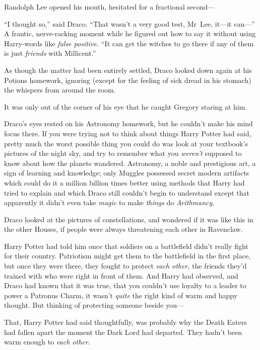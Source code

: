 Randolph Lee opened his mouth, hesitated for a fractional second—

“I thought so,” said Draco. “That wasn’t a very good test, Mr~Lee, it—it can—” A frantic, nerve-racking moment while he figured out how to say it without using Harry-words like \emph{false positive.} “It can get the witches to go there if any of them is just \emph{friends} with Millicent.”

As though the matter had been entirely settled, Draco looked down again at his Potions homework, ignoring (except for the feeling of sick dread in his stomach) the whispers from around the room.

It was only out of the corner of his eye that he caught Gregory staring at him.

\later

Draco’s eyes rested on his Astronomy homework, but he couldn’t make his mind focus there. If you were trying not to think about things Harry Potter had said, pretty much the worst possible thing you could do was look at your textbook’s pictures of the night sky, and try to remember what you \emph{weren’t} supposed to know about how the planets wandered. Astronomy, a noble and prestigious art, a sign of learning and knowledge; only Muggles possessed secret modern artifacts which could do it a million billion times better using methods that Harry had tried to explain and which Draco still couldn’t begin to understand except that apparently it didn’t even take \emph{magic} to make \emph{things} do \emph{Arithmancy.}

Draco looked at the pictures of constellations, and wondered if it was like this in the other Houses, if people were always threatening each other in Ravenclaw.

Harry Potter had told him once that soldiers on a battlefield didn’t really fight for their country. Patriotism might get them to the battlefield in the first place, but once they were there, they fought to protect \emph{each other,} the friends they’d trained with who were right in front of them. And Harry had observed, and Draco had known that it was true, that you couldn’t use loyalty to a leader to power a Patronus Charm, it wasn’t \emph{quite} the right kind of warm and happy thought. But thinking of protecting someone beside you—

That, Harry Potter had said thoughtfully, was probably why the Death Eaters had fallen apart the moment the Dark Lord had departed. They hadn’t been warm enough to \emph{each other}.

